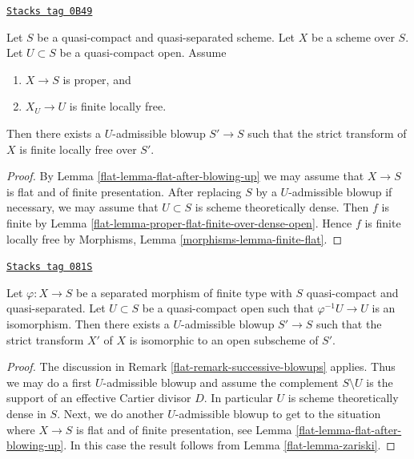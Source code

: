 \begin{lemma}
\label{flat-lemma-finite-after-blowing-up}
\href{https://stacks.math.columbia.edu/tag/0B49}{\texttt{Stacks tag 0B49}}

Let $S$ be a quasi-compact and quasi-separated scheme.
Let $X$ be a scheme over $S$.
Let $U \subset S$ be a quasi-compact open.
Assume
\begin{enumerate}
\item $X \to S$ is proper, and
\item $X_U \to U$ is finite locally free.
\end{enumerate}
Then there exists a $U$-admissible blowup $S' \to S$ such that
the strict transform of $X$ is finite locally free over $S'$.
\end{lemma}

\begin{proof}

By Lemma \ref{flat-lemma-flat-after-blowing-up} we may assume that
$X \to S$ is flat and of finite presentation. After replacing
$S$ by a $U$-admissible blowup if necessary, we may assume
that $U \subset S$ is scheme theoretically dense. Then $f$ is
finite by Lemma \ref{flat-lemma-proper-flat-finite-over-dense-open}.
Hence $f$ is finite locally free by
Morphisms, Lemma \ref{morphisms-lemma-finite-flat}.
\end{proof}

\begin{lemma}
\label{flat-lemma-zariski-after-blowup}
\href{https://stacks.math.columbia.edu/tag/081S}{\texttt{Stacks tag 081S}}

Let $\varphi : X \to S$ be a separated morphism of finite type with
$S$ quasi-compact and quasi-separated. Let $U \subset S$ be a
quasi-compact open such that $\varphi^{-1}U \to U$ is an isomorphism.
Then there exists a $U$-admissible blowup $S' \to S$ such that
the strict transform $X'$ of $X$ is isomorphic to an open subscheme
of $S'$.
\end{lemma}

\begin{proof}

The discussion in Remark \ref{flat-remark-successive-blowups} applies.
Thus we may do a first $U$-admissible blowup and assume the complement
$S \setminus U$ is the support of an effective Cartier divisor $D$.
In particular $U$ is scheme theoretically dense in $S$.
Next, we do another $U$-admissible blowup to get to the situation where
$X \to S$ is flat and of finite presentation, see
Lemma \ref{flat-lemma-flat-after-blowing-up}.
In this case the result follows from Lemma \ref{flat-lemma-zariski}.
\end{proof}

